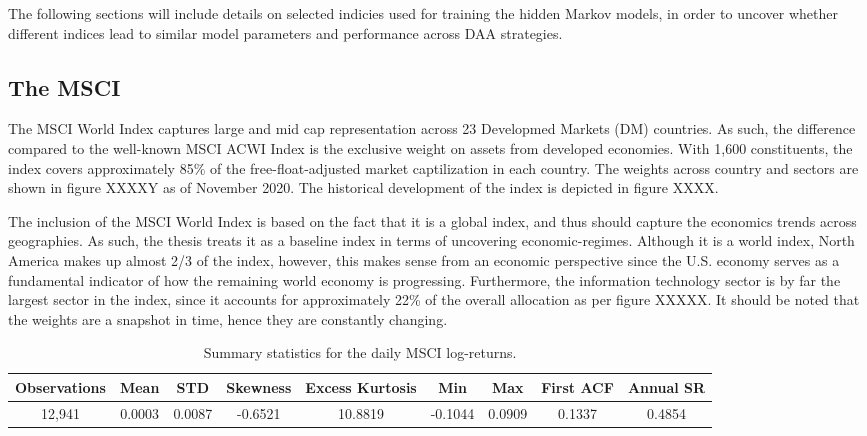 The following sections will include details on selected indicies used for training the hidden Markov models, in order to uncover whether different indices lead to similar model parameters and performance across DAA strategies. 

\subsection{The MSCI}
\label{subsection: MSCI Index}
The MSCI World Index captures large and mid cap representation across 23 Developmed Markets (DM) countries. As such, the difference compared to the well-known MSCI ACWI Index is the exclusive weight on assets from developed economies. With 1,600 constituents, the index covers approximately 85\% of the free-float-adjusted market captilization in each country. The weights across country and sectors are shown in figure XXXXY as of November 2020. The historical development of the index is depicted in figure XXXX. 
 



The inclusion of the MSCI World Index is based on the fact that it is a global index, and thus should capture the economics trends across geographies. As such, the thesis treats it as a baseline index in terms of uncovering economic-regimes. Although it is a world index, North America makes up almost 2/3 of the index, however, this makes sense from an economic perspective since the U.S. economy serves as a fundamental indicator of how the remaining world economy is progressing. Furthermore, the information technology sector is by far the largest sector in the index, since it accounts for approximately 22\% of the overall allocation as per figure XXXXX. It should be noted that the weights are a snapshot in time, hence they are constantly changing. 

\begin{table}[H]
\caption{Summary statistics for the daily MSCI log-returns.}
\centering
\begin{tabular}{c c c c c c c c c} 
\hline\hline
Observations & Mean & STD & Skewness & Excess Kurtosis & Min & Max & First ACF & Annual SR \\
\hline
12,941 & 0.0003 & 0.0087 & -0.6521 & 10.8819 & -0.1044 & 0.0909 & 0.1337 & 0.4854 \\
\hline
\end{tabular}
\label{tab:summary_stats_MSCI}
\end{table}


